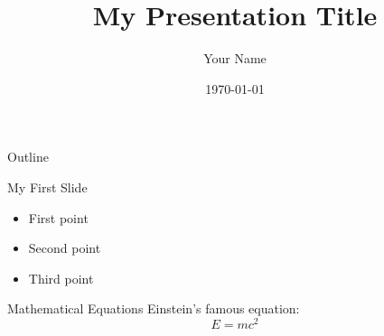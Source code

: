 \documentclass{beamer}
\title{My Presentation Title}
\author{Your Name}
\institute{Your Institution}
\date{\today}
\begin{document}
\begin{frame}
    \titlepage
\end{frame}

\begin{frame}{Outline}
    \tableofcontents
\end{frame}

\begin{frame}{My First Slide}
    \begin{itemize}
        \item First point
        \item Second point
        \item Third point
    \end{itemize}
\end{frame}

\begin{frame}{Mathematical Equations}
    Einstein's famous equation:
    \begin{equation}
        E = mc^2
    \end{equation}
\end{frame}
\end{document}
